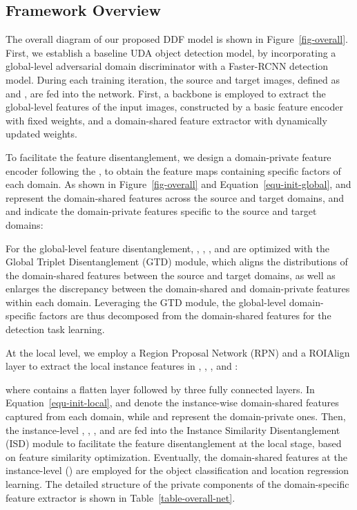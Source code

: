 \documentclass[journal]{IEEEtran}
\begin{document}
\subsection{Framework Overview~\label{sec-overall}}



The overall diagram of our proposed DDF model is shown in Figure~\ref{fig-overall}. First, we establish a baseline UDA object detection model, by incorporating a global-level adversarial domain discriminator with a Faster-RCNN detection model. During each training iteration, the source and target images, defined as  and , are fed into the network. First, a backbone is employed to extract the global-level features of the input images, constructed by a basic feature encoder  with fixed weights, and a domain-shared feature extractor  with dynamically updated weights. 



To facilitate the feature disentanglement, we design a domain-private feature encoder  following the , to obtain the feature maps containing specific factors of each domain. As shown in Figure~\ref{fig-overall} and Equation~\ref{equ-init-global},  and  represent the domain-shared features across the source and target domains, and  and  indicate the domain-private features specific to the source and target domains:




For the global-level feature disentanglement, , , , and  are optimized with the Global Triplet Disentanglement (GTD) module, which aligns the distributions of the domain-shared features between the source and target domains, as well as enlarges the discrepancy between the domain-shared and domain-private features within each domain. Leveraging the GTD module, the global-level domain-specific factors are thus decomposed from the domain-shared features for the detection task learning. 

At the local level, we employ a Region Proposal Network (RPN) and a ROIAlign layer to extract the local instance features in , , , and :


where  contains a flatten layer followed by three fully connected layers. In Equation~\ref{equ-init-local},  and  denote the instance-wise domain-shared features captured from each domain, while  and  represent the domain-private ones. Then, the instance-level , , , and  are fed into the Instance Similarity Disentanglement (ISD) module to facilitate the feature disentanglement at the local stage, based on feature similarity optimization. Eventually, the domain-shared features at the instance-level () are employed for the object classification and location regression learning. The detailed structure of the private components of the domain-specific feature extractor is shown in Table~\ref{table-overall-net}.
\end{document}
